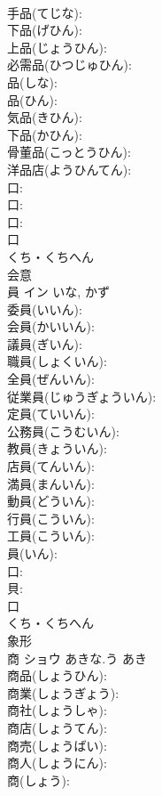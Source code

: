 \documentclass[8pt]{extreport}
\begin{document}
\begin{CJK}{UTF8}{min}
\\	手品(てじな): 
\\	下品(げひん): 
\\	上品(じょうひん): 
\\	必需品(ひつじゅひん): 
\\	品(しな): 
\\	品(ひん): 
\\	気品(きひん): 
\\	下品(かひん): 
\\	骨董品(こっとうひん): 
\\	洋品店(ようひんてん): 
\\	口: 
\\	口: 
\\	口: 
\\	口	
\\	くち・くちへん	
\\	会意 
\\	員	イン		いな, かず	
\\	委員(いいん): 
\\	会員(かいいん): 
\\	議員(ぎいん): 
\\	職員(しょくいん): 
\\	全員(ぜんいん): 
\\	従業員(じゅうぎょういん): 
\\	定員(ていいん): 
\\	公務員(こうむいん): 
\\	教員(きょういん): 
\\	店員(てんいん): 
\\	満員(まんいん): 
\\	動員(どういん): 
\\	行員(こういん): 
\\	工員(こういん): 
\\	員(いん): 
\\	口: 
\\	貝: 
\\	口	
\\	くち・くちへん	
\\	象形 
\\	商	ショウ	あきな.う	あき	
\\	商品(しょうひん): 
\\	商業(しょうぎょう): 
\\	商社(しょうしゃ): 
\\	商店(しょうてん): 
\\	商売(しょうばい): 
\\	商人(しょうにん): 
\\	商(しょう): 

\end{CJK}
\end{document}
